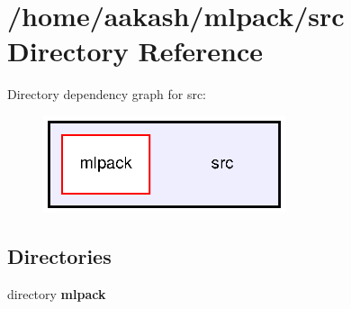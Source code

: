 \section{/home/aakash/mlpack/src Directory Reference}
\label{dir_68267d1309a1af8e8297ef4c3efbcdba}
Directory dependency graph for src\+:
\nopagebreak
\begin{figure}[H]
\begin{center}
\leavevmode
\includegraphics[width=202pt]{dir_68267d1309a1af8e8297ef4c3efbcdba_dep}
\end{center}
\end{figure}
\subsection*{Directories}
\begin{DoxyCompactItemize}
\item 
directory \textbf{ mlpack}
\end{DoxyCompactItemize}
